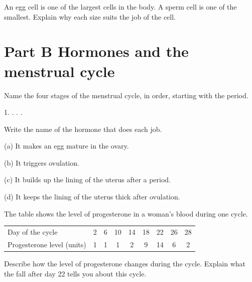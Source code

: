 \documentclass[11pt]{article}
\begin{document}
\Q An egg cell is one of the largest cells in the body. A sperm cell is one of the smallest. Explain why each size suits the job of the cell.

\section{Part B \textperiodcentered{} Hormones and the menstrual cycle}
\Q Name the four stages of the menstrual cycle, in order, starting with the period.
\par 1.  .  .  . \par\vspace{2mm}

\Q Write the name of the hormone that does each job.
\par (a) It makes an egg mature in the ovary. \hfill{}
\par (b) It triggers ovulation. \hfill{}
\par (c) It builds up the lining of the uterus after a period. \hfill{}
\par (d) It keeps the lining of the uterus thick after ovulation. \hfill{}\par\vspace{2mm}

\Q The table shows the level of progesterone in a woman's blood during one cycle.
\par\vspace{1mm}
\begin{tabular}{@{}l *{8}{c}@{}}
\toprule
Day of the cycle & 2 & 6 & 10 & 14 & 18 & 22 & 26 & 28\\
Progesterone level (units) & 1 & 1 & 1 & 2 & 9 & 14 & 6 & 2\\
\bottomrule
\end{tabular}\par\vspace{1mm}
 Describe how the level of progesterone changes during the cycle.
 Explain what the fall after day 22 tells you about this cycle.
\end{document}
